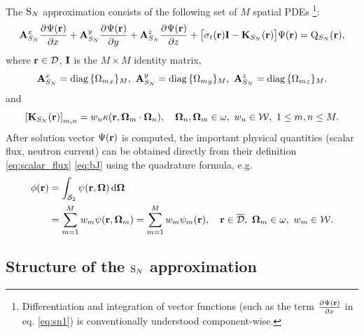 The $\text{S}_{N}$ approximation consists of the
following set of $M$ spatial PDEs \footnote{Differentiation and integration of vector functions
(such as the term $\frac{\partial^{}\Psi(\mathbf{r})}{\partial x^{}}$ in eq. \eqref{eq:sn1}) is conventionally understood component-wise.}:
\begin{equation}\label{eq:sn1} 
\mathbf{A}_{S_N}^x\frac{\partial^{}\Psi(\mathbf{r})}{\partial x^{}} + \mathbf{A}_{S_N}^y\frac{\partial^{}\Psi(\mathbf{r})}{\partial y^{}} +
\mathbf{A}_{S_N}^z\frac{\partial^{}\Psi(\mathbf{r})}{\partial z^{}} + \bigl[\sigma_t(\mathbf{r})\mathbf{I} - \mathbf{K}_{S_N}(\mathbf{r})\bigr]\Psi(\mathbf{r}) = \mathrm{Q}_{S_N}(\mathbf{r}),
\end{equation}
where $\mathbf{r}\in\mathcal{D}$, $\mathbf{I}$ is the $M\times M$ identity matrix,
$$
	\mathbf{A}_{S_N}^x = \operatorname{diag\,}\{{\Omega_{m}}_x\}_{M},\ \mathbf{A}_{S_N}^y = \operatorname{diag\,}\{{\Omega_{m}}_y\}_{M},\
	\mathbf{A}_{S_N}^z = \operatorname{diag\,}\{{\Omega_{m}}_z\}_{M}.
$$
and
\begin{equation}\label{eq:SNK}
	\left[\mathbf{K}_{S_N}(\mathbf{r})\right]_{m,n} = w_n \kappa(\mathbf{r},\mathbf{\Omega}_m\cdot\mathbf{\Omega}_n),\quad
	\mathbf{\Omega}_n,\mathbf{\Omega}_m\in \omega,\ w_n\in \mathcal{W},\ 1 \leq m,n \leq M.
\end{equation}
After solution vector $\Psi(\mathbf{r})$ is computed, the
important physical quantities (scalar flux, neutron current) can be obtained directly from their definition \eqref{eq:scalar_flux}
\eqref{eq:bJ} using the quadrature formula, e.g.
\begin{equation}\label{eq:scalar_flux_sn}
\begin{aligned}
	\phi(\mathbf{r}) &= \int_{\mathcal{S}_2}\psi(\mathbf{r},\mathbf{\Omega})\,\text{d}\mathbf{\Omega}\,\\
	 &= \sum_{m=1}^{M} w_m \psi(\mathbf{r},\mathbf{\Omega}_m) = \sum_{m=1}^{M} w_m \psi_m(\mathbf{r}), \quad
	\mathbf{r}\in \overline{\mathcal{D}},\ \mathbf{\Omega}_m\in \omega,\ w_m\in \mathcal{W}.
\end{aligned}
\end{equation}



\subsection{Structure of the $\text{S}_{N}$ approximation}
